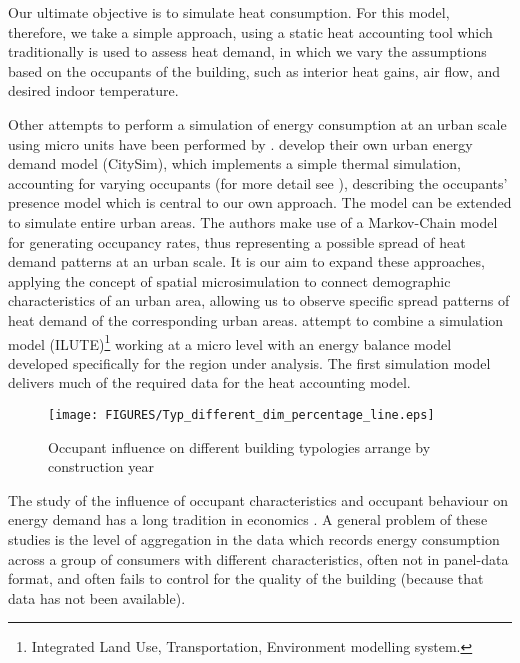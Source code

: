 \documentclass[11pt]{IJM-article}
\begin{document}
Our ultimate objective is to simulate heat consumption. For this model,
therefore, we take a simple approach, using a static heat accounting tool which
traditionally is used to assess heat demand, in which we vary the assumptions
based on the occupants of the building, such as interior heat gains, air flow,
and desired indoor temperature.

Other attempts to perform a simulation of energy consumption at an urban scale
using micro units have been performed by .  \citeauthor{Haldi.2011} develop their own urban energy demand
model (CitySim), which implements a simple thermal simulation, accounting for
varying occupants (for more detail see ), describing the occupants' presence model which is central to our
own approach. The model can be extended to simulate entire urban areas.  The
authors make use of a Markov-Chain model for generating occupancy rates, thus
representing a possible spread of heat demand patterns at an urban scale.  It
is our aim to expand these approaches, applying the concept of spatial
microsimulation to connect demographic characteristics of an urban area,
allowing us to observe specific spread patterns of heat demand of the
corresponding urban areas. \citeauthor{Chingcuanco.2012} attempt to combine a
simulation model (ILUTE)\footnote{Integrated Land Use, Transportation,
Environment modelling system.} working at a micro level with an energy balance
model developed specifically for the region under analysis. The first
simulation model delivers much of the required data for the heat accounting
model.

\begin{figure}[htb]
    \caption{Occupant influence on different building typologies arrange by
    	construction year}\label{fig:3} 
    \texttt{[image: FIGURES/Typ\_different\_dim\_percentage\_line.eps]}
\end{figure}

The study of the influence of occupant characteristics and occupant behaviour
on energy demand has a long tradition in economics . A general problem of these
studies is the level of aggregation in the data which records energy
consumption across a group of consumers with different characteristics, often
not in panel-data format, and often fails to control for the quality of the
building (because that data has not been available).
\end{document}
